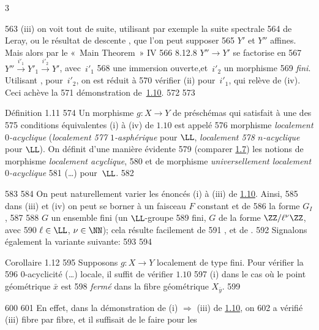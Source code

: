 3	\documentclass[10pt]{../fichiers-configuration-latex/smfart}
\begin{document}
   563	(iii) on voit tout de suite, utilisant par exemple la suite spectrale
   564	de Leray, ou le résultat de descente , que l'on peut supposer
   565	$Y'$ et $Y''$ affines. Mais alors par le « Main Theorem »  \EGA IV
   566	8.12.8 $Y''\rightarrow Y'$ se factorise en
   567	$Y''\xrightarrow{i'_1}Y'_1\xrightarrow{i'_2}Y'$, avec~$i'_1$
   568	une immersion ouverte,\pageoriginale et~$i'_2$ un morphisme
   569	\emph{fini}. Utilisant ,  pour~$i'_2$, on est réduit à
   570	vérifier (ii) pour~$i'_1$, qui relève de (iv). Ceci achève la
   571	démonstration de~\hyperref[XV.prop1.10]{1.10}.
   572	
   573	\begin{enonce*}{Définition 1.11}
   574	Un morphisme $g:X\rightarrow Y$ de préschémas qui satisfait à une des
   575	conditions équivalentes {\rm(i)} à {\rm(iv)} de $1.10$ est appelé
   576	morphisme \emph{localement $0$-acyclique} (\resp \emph{localement
   577	$1$-asphérique} pour $\LL$, \resp \emph{localement
   578	$n$-acyclique} pour $\LL$). On définit d'une manière évidente
   579	(comparer \hyperref[XV.def1.7]{1.7}) les notions de morphisme \emph{localement acyclique},
   580	et de morphisme \emph{universellement localement $0$-acyclique}
   581	(\resp\ldots) pour~$\LL$.
   582	\end{enonce*}
   583	
   584	On peut naturellement varier les énoncés (i) à (iii) de \hyperref[XV.prop1.10]{1.10}. Ainsi,
   585	dans (iii) et (iv) on peut se borner à un faisceau $F$ constant et de
   586	la forme $G_{I}$,
   587	%
   588	 $G$ un ensemble fini (\resp un $\LL$-groupe
   589	fini, \resp $G$ de la forme $\ZZ/\ell^{\nu}\ZZ$, avec
   590	$\ell\in\LL$, $\nu\in \NN$); cela résulte facilement de
   591	,  et de .
   592	Signalons également la variante suivante:
   593	
   594	\begin{enonce*}{Corollaire 1.12}
   595	Supposons $g:X\rightarrow Y$ localement de type fini. Pour vérifier la
   596	$0$-acyclicité (\resp\ldots) locale, il suffit de vérifier $1.10$
   597	{\rm(i)} dans le cas où le point géométrique $\bar{x}$ est
   598	\emph{fermé} dans la fibre géométrique $X_{\bar{y}}$.
   599	\end{enonce*}
   600	
   601	En effet, dans la démonstration de (i) $\Rightarrow$ (iii) de \hyperref[XV.prop1.10]{1.10}, on
   602	a vérifié (iii) fibre par fibre, et il suffisait de le faire pour les
\end{document}
